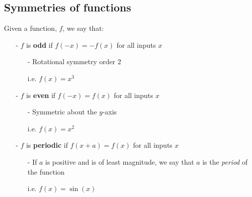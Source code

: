 \documentclass[11pt, a4paper]{article}
\begin{document}
\normalsize
\vspace{0.3cm}

\subsection{Symmetries of functions}
Given a function, $f$, we say that:
\begin{itemize}
\item[-] $f$ is \textbf{odd} if $f(-x)=-f(x)$ for all inputs $x$
\vspace{-0.35cm}
\begin{itemize}
\item[-] Rotational symmetry order $2$
\vspace{-0.1cm}
\item[] i.e. $f(x)=x^{3}$
\end{itemize}
\item[-] $f$ is \textbf{even} if $f(-x)=f(x)$ for all inputs $x$
\vspace{-0.35cm}
\begin{itemize}
\item[-] Symmetric about the $y$-axis
\vspace{-0.1cm}
\item[] i.e. $f(x)=x^{2}$
\end{itemize}
\item[-] $f$ is \textbf{periodic} if $f(x+a)=f(x)$ for all inputs $x$
\vspace{-0.35cm}
\begin{itemize}
\item[-] If $a$ is positive and is of least magnitude, we say that $a$ is the \emph{period} of the function
\vspace{-0.1cm}
\item[] i.e. $f(x)=\sin(x)$
\end{itemize}
\end{itemize}
\vspace{0.2cm}
\end{document}
